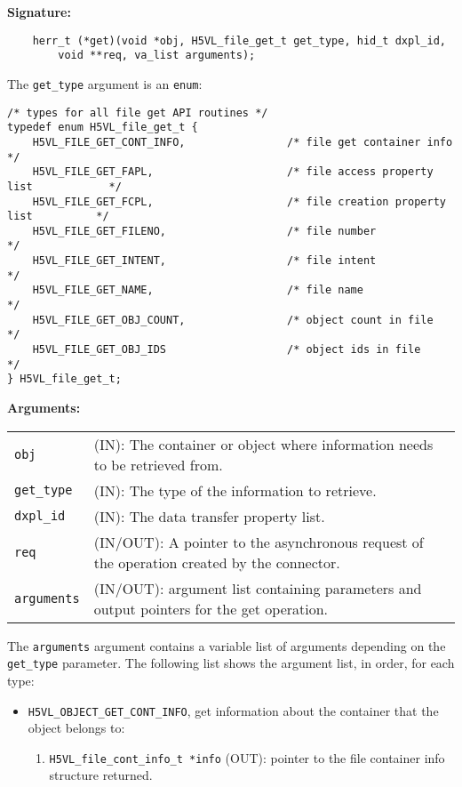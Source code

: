 \begin{mdframed}[style=bgbox] 
\textbf{Signature:}
\begin{lstlisting}
    herr_t (*get)(void *obj, H5VL_file_get_t get_type, hid_t dxpl_id, 
        void **req, va_list arguments);
\end{lstlisting}

The \texttt{get\_type} argument is an \texttt{enum}:
\begin{lstlisting}
/* types for all file get API routines */
typedef enum H5VL_file_get_t {                                                   
    H5VL_FILE_GET_CONT_INFO,                /* file get container info              */
    H5VL_FILE_GET_FAPL,                     /* file access property list            */
    H5VL_FILE_GET_FCPL,                     /* file creation property list          */
    H5VL_FILE_GET_FILENO,                   /* file number                          */
    H5VL_FILE_GET_INTENT,                   /* file intent                          */
    H5VL_FILE_GET_NAME,                     /* file name                            */
    H5VL_FILE_GET_OBJ_COUNT,                /* object count in file                 */
    H5VL_FILE_GET_OBJ_IDS                   /* object ids in file                   */
} H5VL_file_get_t; 
\end{lstlisting}

\textbf{Arguments:}\\
\begin{tabular}{l p{13.5cm}}
  \texttt{obj} & (IN): The container or object where information needs to be
  retrieved from.\\
  \texttt{get\_type} & (IN): The type of the information to retrieve.\\
  \texttt{dxpl\_id} & (IN): The data transfer property list.\\
  \texttt{req} & (IN/OUT): A pointer to the asynchronous request of the
  operation created by the connector.\\
  \texttt{arguments} & (IN/OUT): argument list containing parameters and
  output pointers for the get operation. \\
\end{tabular}

The \texttt{arguments} argument contains a variable list of arguments
depending on the \texttt{get\_type} parameter. The following list shows
the argument list, in order, for each type:

\begin{itemize}
\item \texttt{H5VL\_OBJECT\_GET\_CONT\_INFO}, get information about the container
    that the object belongs to:
  \begin{enumerate}
  \item \texttt{H5VL\_file\_cont\_info\_t *info} (OUT): pointer to the file
    container info structure returned.
  \end{enumerate}


\end{itemize}
\end{mdframed}
